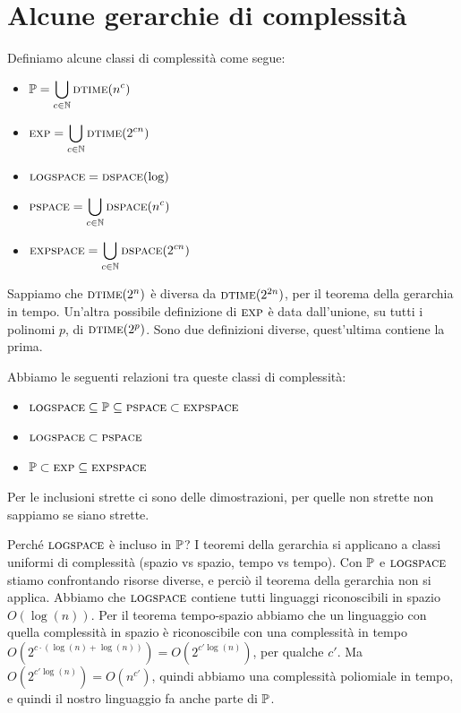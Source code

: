 \section{Alcune gerarchie di complessità}

Definiamo alcune classi di complessità come segue:
\begin{itemize}
    \item $\mathbb{P} = \displaystyle\bigcup_{c \in \mathbb{N}}\textsc{dtime}(n^{c})$
    \item $\textsc{exp} = \displaystyle\bigcup_{c \in \mathbb{N}}\textsc{dtime}(2^{cn})$
    \item $\textsc{logspace} = \textsc{dspace}(\log)$
    \item $\textsc{pspace} = \displaystyle\bigcup_{c \in \mathbb{N}}\textsc{dspace}(n^{c})$
    \item $\textsc{expspace} = \displaystyle\bigcup_{c \in \mathbb{N}}\textsc{dspace}(2^{cn})$
\end{itemize}

Sappiamo che $\textsc{dtime}(2^{n})$ è diversa da $\textsc{dtime}(2^{2n})$, per il teorema della gerarchia in
tempo.  Un'altra possibile definizione di $\textsc{exp}$ è data dall'unione, su tutti i polinomi $p$, di
$\textsc{dtime}(2^{p})$. Sono due definizioni diverse, quest'ultima contiene la prima.

Abbiamo le seguenti relazioni tra queste classi di complessità:
\begin{itemize}
    \item $\textsc{logspace} \subseteq \mathbb{P} \subseteq \textsc{pspace} \subset \textsc{expspace}$
    \item $\textsc{logspace} \subset \textsc{pspace}$
    \item $\mathbb{P} \subset \textsc{exp} \subseteq \textsc{expspace}$
\end{itemize}

Per le inclusioni strette ci sono delle dimostrazioni, per quelle non strette non
sappiamo se siano strette.

Perché $\textsc{logspace}$ è incluso in $\mathbb{P}$? I teoremi della gerarchia si applicano a classi uniformi di
complessità (spazio vs spazio, tempo vs tempo). Con $\mathbb{P}$ e $\textsc{logspace}$ stiamo confrontando risorse
diverse, e perciò il teorema della gerarchia non si applica. Abbiamo che $\textsc{logspace}$ contiene tutti
linguaggi riconoscibili in spazio $O(\log(n))$. Per il teorema tempo-spazio abbiamo che un
linguaggio con quella complessità in spazio è riconoscibile con una complessità in tempo
$O(2^{c\cdot(\log(n) + \log(n))}) = O(2^{c'\log(n)})$, per qualche $c'$. Ma $O(2^{c'\log(n)}) =
O(n^{c'})$, quindi abbiamo una complessità poliomiale in tempo, e quindi il nostro linguaggio fa
anche parte di $\mathbb{P}$.

